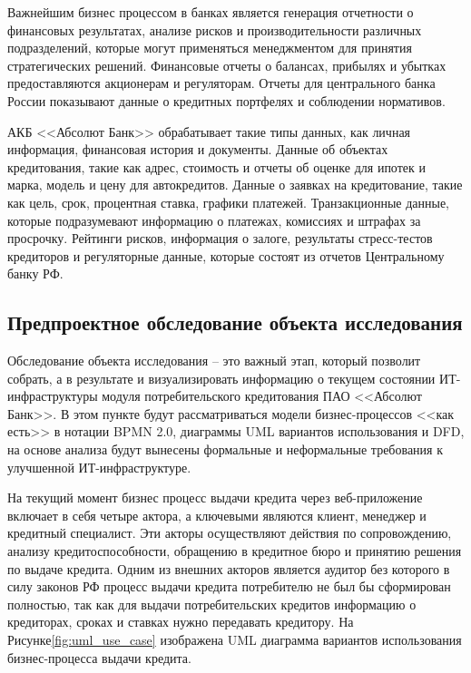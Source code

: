 \documentclass[14pt, a4paper]{extarticle}
\begin{document}
Важнейшим бизнес процессом в банках является генерация отчетности о финансовых
результатах, анализе рисков и производительности различных подразделений,
которые могут применяться менеджментом для принятия стратегических решений.
Финансовые отчеты о балансах, прибылях и убытках предоставляются акционерам и
регуляторам. Отчеты для центрального банка России показывают данные о кредитных
портфелях и соблюдении нормативов.

АКБ <<Абсолют Банк>> обрабатывает такие типы данных, как личная информация,
финансовая история и документы. Данные об объектах кредитования, такие как
адрес, стоимость и отчеты об оценке для ипотек и марка, модель и цену для
автокредитов. Данные о заявках на кредитование, такие как цель, срок,
процентная ставка, графики платежей. Транзакционные данные, которые
подразумевают информацию о платежах, комиссиях и штрафах за просрочку. Рейтинги
рисков, информация о залоге, результаты стресс-тестов кредиторов и регуляторные
данные, которые состоят из отчетов Центральному банку РФ.

\subsection{Предпроектное обследование объекта исследования}

Обследование объекта исследования -- это важный этап, который позволит
собрать, а в результате и визуализировать информацию о текущем состоянии
ИТ-инфраструктуры модуля потребительского кредитования ПАО <<Абсолют Банк>>. В
этом пункте будут рассматриваться модели бизнес-процессов <<как есть>> в
нотации BPMN 2.0, диаграммы UML вариантов использования и DFD, на основе
анализа будут вынесены формальные и неформальные требования к улучшенной
ИТ-инфраструктуре.

На текущий момент бизнес процесс выдачи кредита через веб-приложение включает в
себя четыре актора, а ключевыми являются клиент, менеджер и кредитный
специалист. Эти акторы осуществляют действия по сопровождению, анализу
кредитоспособности, обращению в кредитное бюро и принятию решения по выдаче
кредита. Одним из внешних акторов является аудитор без которого в силу законов
РФ процесс выдачи кредита потребителю не был бы сформирован полностью, так как
для выдачи потребительских кредитов информацию о кредиторах, сроках и ставках
нужно передавать кредитору. На Рисунке\;\ref{fig:uml_use_case} изображена UML
диаграмма вариантов использования бизнес-процесса выдачи кредита.
\end{document}
